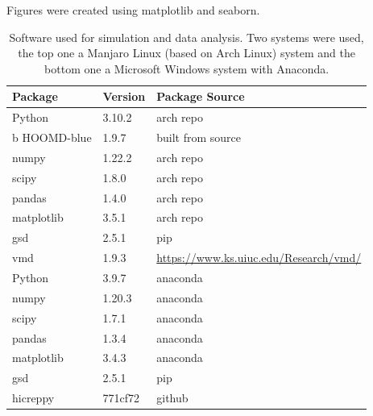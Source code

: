 \documentclass[a4paper,11pt,oneside,final,english,toc=bib]{scrbook}
\begin{document}
Figures were created using matplotlib\cite{j_d_hunter_matplotlib_2007} and seaborn\cite{waskom_seaborn_2021}.

\begin{table}[H]
\centering
\label{tab:used_software}
\caption{Software used for simulation and data analysis. Two systems were used, the top one a Manjaro Linux (based on Arch Linux) system and the bottom one a Microsoft Windows system with Anaconda.}
  \begin{tabular}{l @{\phantom{abc}} l @{\phantom{abc}} l}
  \toprule
    Package & Version & Package Source \\
  \midrule
    Python & 3.10.2 & arch repo \\b
    HOOMD-blue & 1.9.7 & built from source \\
    numpy & 1.22.2 & arch repo \\
    scipy & 1.8.0 & arch repo \\
    pandas & 1.4.0 & arch repo \\
    matplotlib & 3.5.1 & arch repo \\
    gsd & 2.5.1 & pip \\
    vmd & 1.9.3 & \url{https://www.ks.uiuc.edu/Research/vmd/} \\
  \midrule
    Python & 3.9.7 & anaconda \\
    numpy & 1.20.3 & anaconda \\
    scipy & 1.7.1 & anaconda \\
    pandas & 1.3.4 & anaconda \\
    matplotlib & 3.4.3 & anaconda \\
    gsd & 2.5.1 & pip \\
    hicreppy & 771cf72 & github \\
  \bottomrule
  \end{tabular}
\end{table}







\end{document}

